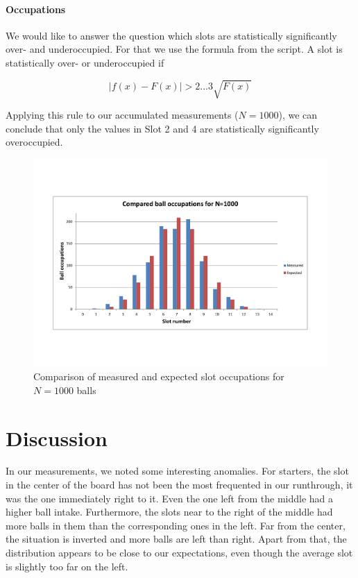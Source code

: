\documentclass{scrreprt}
\begin{document}
\paragraph*{Occupations}
We would like to answer the question which slots are statistically significantly over- and underoccupied. For that we use the formula from the script. A slot is statistically over- or underoccupied if

\begin{equation*}
\lvert f(x)-F(x) \rvert > 2...3 \sqrt{F(x)}
\end{equation*}

Applying this rule to our accumulated measurements ($N=1000$), we can conclude that only the values in Slot 2 and 4 are statistically significantly overoccupied.

\begin{figure}[H]
    \center   
        \includegraphics[width=1.0\textwidth]{img/ball_occup_1000_combo.pdf}
        \caption{Comparison of measured and expected slot occupations for $N=1000$ balls}
\end{figure}

\section{Discussion}
In our measurements, we noted some interesting anomalies. For starters, the slot in the center of the board has not been the most frequented in our runthrough, it was the one immediately right to it. Even the one left from the middle had a higher ball intake. Furthermore, the slots near to the right of the middle had more balls in them than the corresponding ones in the left. Far from the center, the situation is inverted and more balls are left than right. Apart from that, the distribution appears to be close to our expectations, even though the average slot is slightly too far on the left.
\end{document}
